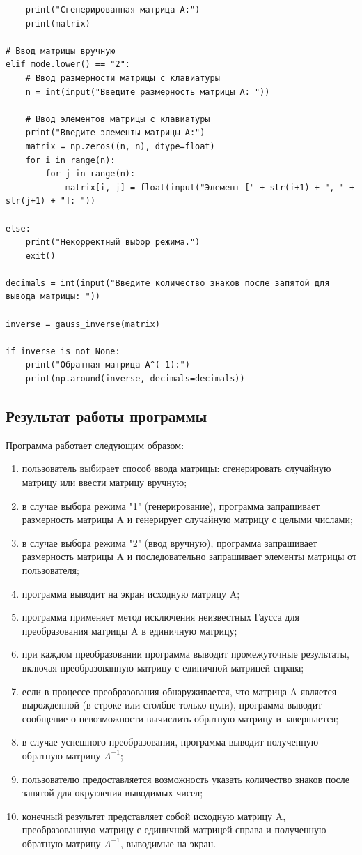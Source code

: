 \documentclass[12pt,a4paper]{scrartcl}
\begin{document}
\begin{verbatim}
    print("Сгенерированная матрица A:")
    print(matrix)

# Ввод матрицы вручную
elif mode.lower() == "2":
    # Ввод размерности матрицы с клавиатуры
    n = int(input("Введите размерность матрицы A: "))
    
    # Ввод элементов матрицы с клавиатуры
    print("Введите элементы матрицы A:")
    matrix = np.zeros((n, n), dtype=float)
    for i in range(n):
        for j in range(n):
            matrix[i, j] = float(input("Элемент [" + str(i+1) + ", " + str(j+1) + "]: "))
    
else:
    print("Некорректный выбор режима.")
    exit()

decimals = int(input("Введите количество знаков после запятой для вывода матрицы: "))

inverse = gauss_inverse(matrix)

if inverse is not None:
    print("Обратная матрица A^(-1):")
    print(np.around(inverse, decimals=decimals))
\end{verbatim}

\subsection{Результат работы программы}
Программа работает следующим образом:

\begin{enumerate}
    \item пользователь выбирает способ ввода матрицы: сгенерировать случайную матрицу или ввести матрицу вручную;
    \item в случае выбора режима "1" (генерирование), программа запрашивает размерность матрицы A и генерирует случайную матрицу с целыми числами;
    \item в случае выбора режима "2" (ввод вручную), программа запрашивает размерность матрицы A и последовательно запрашивает элементы матрицы от пользователя;
    \item программа выводит на экран исходную матрицу A;
    \item программа применяет метод исключения неизвестных Гаусса для преобразования матрицы A в единичную матрицу;
    \item при каждом преобразовании программа выводит промежуточные результаты, включая преобразованную матрицу с единичной матрицей справа;
    \item если в процессе преобразования обнаруживается, что матрица A является вырожденной (в строке или столбце только нули), программа выводит сообщение о невозможности вычислить обратную матрицу и завершается;
    \item в случае успешного преобразования, программа выводит полученную обратную матрицу $A^{-1}$;
    \item пользователю предоставляется возможность указать количество знаков после запятой для округления выводимых чисел;
    \item конечный результат представляет собой исходную матрицу A, преобразованную матрицу с единичной матрицей справа и полученную обратную матрицу $A^{-1}$, выводимые на экран.
    \end{enumerate}
    \noindent
\end{document}
